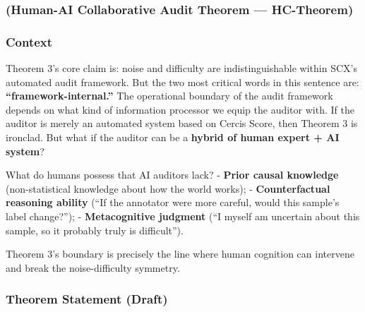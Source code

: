 \documentclass[
  12pt,
]{article}
\begin{document}
\subsubsection{(Human-AI Collaborative Audit Theorem --- HC-Theorem)}\label{hc-theorem-next}

\subsubsection{Context}\label{context-hc}

Theorem 3's core claim is: noise and difficulty are indistinguishable within SCX's automated audit framework. But the two most critical words in this sentence are: \textbf{``framework-internal.''} The operational boundary of the audit framework depends on what kind of information processor we equip the auditor with. If the auditor is merely an automated system based on Cercis Score, then Theorem 3 is ironclad. But what if the auditor can be a \textbf{hybrid of human expert + AI system}?

What do humans possess that AI auditors lack?
- \textbf{Prior causal knowledge} (non-statistical knowledge about how the world works);
- \textbf{Counterfactual reasoning ability} (``If the annotator were more careful, would this sample's label change?'');
- \textbf{Metacognitive judgment} (``I myself am uncertain about this sample, so it probably truly is difficult'').

Theorem 3's boundary is precisely the line where human cognition can intervene and break the noise-difficulty symmetry.

\subsubsection{Theorem Statement (Draft)}\label{hc-statement}
\end{document}
